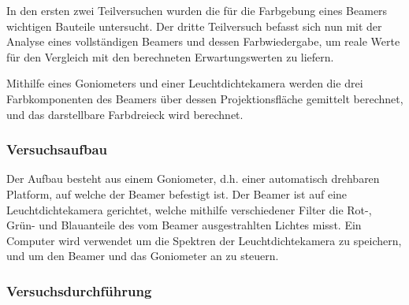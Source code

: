 
In den ersten zwei Teilversuchen wurden die für die Farbgebung eines Beamers wichtigen Bauteile untersucht. Der dritte Teilversuch befasst sich nun mit der Analyse eines vollständigen Beamers und dessen Farbwiedergabe, um reale Werte für den Vergleich mit den berechneten Erwartungswerten zu liefern.

Mithilfe eines Goniometers und einer Leuchtdichtekamera werden die drei Farbkomponenten des Beamers über dessen Projektionsfläche gemittelt berechnet, und das darstellbare Farbdreieck wird berechnet.

\subsubsection{Versuchsaufbau}

Der Aufbau besteht aus einem Goniometer, d.h. einer automatisch drehbaren Platform, auf welche der Beamer befestigt ist. Der Beamer ist auf eine Leuchtdichtekamera gerichtet, welche mithilfe verschiedener Filter die Rot-, Grün- und Blauanteile des vom Beamer ausgestrahlten Lichtes misst. Ein Computer wird verwendet um die Spektren der Leuchtdichtekamera zu speichern, und um den Beamer und das Goniometer an zu steuern.

\subsubsection{Versuchsdurchführung}

